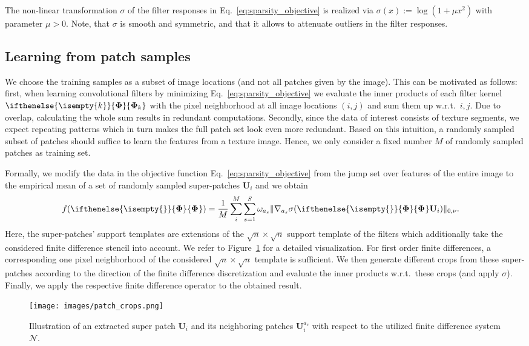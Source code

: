 \documentclass[journal]{IEEEtran}
\newcommand{\Matrix}[1]{\mathbf{#1}}
\newcommand{\AOF}[1]{\ifthenelse{\isempty{#1}}{\boldsymbol{\Phi}}{\boldsymbol{\Phi}_{#1}}}
\begin{document}
The non-linear transformation  $\sigma$ of the filter responses 
in Eq.~\eqref{eq:sparsity_objective} is realized via 
 $\sigma(x):=\log(1+\mu x^2)$ with parameter $\mu >0$. Note, that $\sigma$ is smooth and symmetric,  
and that it allows to 
attenuate outliers in the filter responses.

\subsection{Learning from patch samples}
\label{subsec:learnignFromPatch}

We choose the training samples as a subset of image locations (and not all patches given by the image).
This can be motivated as follows: first, when learning convolutional filters by minimizing Eq.~\eqref{eq:sparsity_objective} we evaluate the inner products of each filter kernel $\AOF{k}$ with the pixel neighborhood at all image locations $(i,j)$ and sum them up w.r.t.\ $i,j$.
Due to overlap, calculating the whole sum results in redundant computations.
Secondly, since the data of interest consists of texture segments,
we expect repeating patterns which in turn makes the full patch set look even more redundant. 
Based on this intuition, a randomly sampled subset of patches 
should suffice to learn the features from a texture image. 
Hence,
 we only consider a fixed number $M$ of randomly sampled patches as training set.

Formally, we modify the data in the objective function Eq.~\eqref{eq:sparsity_objective} from the jump set over features of the entire image to the empirical mean of a set of randomly sampled super-patches $\Matrix{U}_i$ and we obtain
\begin{align} \label{eq:sparsity_objective_on_patches}
f(\AOF{}) &= \frac{1}{M} \sum_i^M \sum_{s = 1}^S \omega_{a_s} \Vert \nabla_{a_s} \sigma ( \AOF{} \Matrix{U}_i) \Vert_{0, \nu} .
\end{align}
Here, the super-patches' support templates are extensions of the $\sqrt{n} \times \sqrt{n}$ support template of the filters which additionally take the considered finite difference stencil into account.
We refer to Figure~\ref{fig:patch_crops} for a detailed visualization.
For first order finite differences, a corresponding one pixel neighborhood of the considered $\sqrt{n} \times \sqrt{n}$ template is sufficient.
We then generate different crops from these super-patches according to the direction of the finite difference discretization and evaluate the inner products w.r.t.\ these crops (and apply $\sigma$).
Finally, we apply the respective finite difference operator to the obtained result.  
\begin{figure}
    \texttt{[image: images/patch\_crops.png]}
    \caption{Illustration of an extracted super patch $\Matrix{U}_i$  and its neighboring patches $\Matrix{U}_i^{a_s}$
    with respect to the utilized finite difference system $\mathscr{N}.$}
    \label{fig:patch_crops}
\end{figure}
\end{document}
